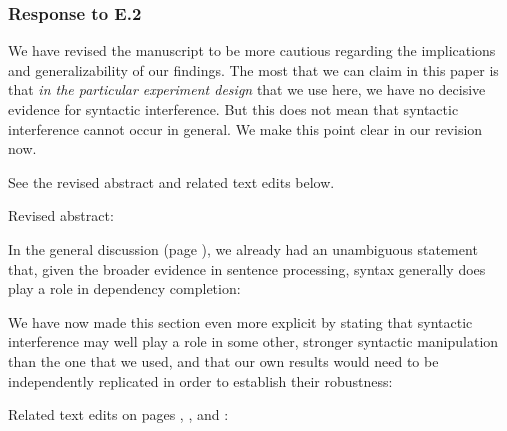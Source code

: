 \documentclass[12pt]{article}
\begin{document}
\subsubsection*{Response to E.2}
We have revised the manuscript to be more cautious regarding the implications and generalizability of our findings. The most that we can claim in this paper is that \textit{in the particular experiment design} that we use here, we have no decisive evidence for syntactic interference. But this does not mean that syntactic interference cannot occur in general. We make this point clear in our revision now.

See the revised abstract and related text edits below.

\bigskip
\noindent Revised abstract:

\begin{quote}
\end{quote}

In the general discussion (page \pageref{gendisccaveat}), we already had an unambiguous statement 
that, given the broader evidence in sentence processing, syntax generally does play a role in dependency completion:

\begin{quote}
\end{quote}

We have now made this section even more explicit by stating that syntactic interference may well play a role in some other, stronger syntactic manipulation than the one that we used, and that our own results would need to be independently replicated in order to establish their robustness:

\begin{quote}
\end{quote}



\noindent Related text edits on pages \pageref{thisdesign1}, \pageref{synsem}, \pageref{thisdesign2} and \pageref{thisdesign3}:

\begin{quote}
\end{quote}

\begin{quote}
\end{quote}

\begin{quote}
\end{quote}
\end{document}
